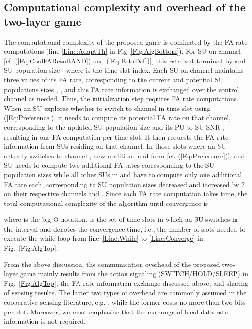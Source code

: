 \documentclass[journal,draftclsnofoot,onecolumn]{IEEEtran}
\theoremstyle{definition}
\begin{document}
\subsection{Computational complexity and overhead of the two-layer game}\label{SubSec:Complexity}
The computational complexity of the proposed game is dominated by the FA rate computations (line \ref{Line:AdaptTh} in Fig~\ref{Fig:AlgBottom}). For SU  on channel  [cf. (\ref{Eq:CoalFAResultAND}) and (\ref{Eq:BetaDef})], this rate is determined by  and SU population size , where  is the time slot index. Each SU  on channel  maintains three values of its FA rate, corresponding to the current and potential SU populations sizes , , and this FA rate information is exchanged over the control channel as needed. Thus, the initialization step requires  FA rate computations. When an SU explores whether to switch to channel  in time slot  using (\ref{Eq:Preference}), it needs to compute its potential FA rate on that channel, corresponding to the updated SU population size  and its PU-to-SU SNR , resulting in one FA computation per time slot. It then requests the FA rate information from SUs residing on that channel. In those slots where an SU  actually switches to channel , new coalitions  and  form [cf. (\ref{Eq:Preference})], and SU  needs to compute two additional FA rates corresponding to the SU population sizes  while all other SUs in  and  have to compute only one additional FA rate each, corresponding to SU population sizes decreased and increased by 2 on their respective channels  and . Since each FA rate computation takes  time, the total computational complexity of the algorithm until convergence is

where  is the big O notation\cite{CLRS},  is the set of time slots in which an SU switches in the interval  and  denotes the convergence time, i.e., the number of slots needed to execute the while loop from line~\ref{Line:While} to \ref{Line:Converge} in Fig.~\ref{Fig:AlgTop}.

From the above discussion, the communication overhead of the proposed two-layer game mainly results from the action signaling (SWITCH/HOLD/SLEEP) in Fig.~\ref{Fig:AlgTop}, the FA rate information exchange discussed above, and sharing of sensing results. The latter two types of overhead are commonly assumed in the cooperative sensing literature, e.g. \cite{HedonicSenseGame,AuctionBased,ZHanCoalSenseGame,FairPayoff,MultiChCoalSenseGame,Overlapp,RLiuEvoGame}, while the former costs no more than two bits per slot. Moreover, we must emphasize that the exchange of local data rate information  is not required.
\end{document}
